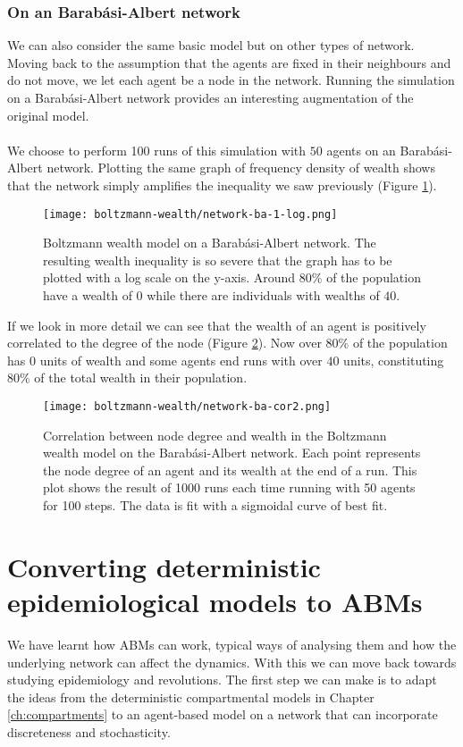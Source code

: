 \subsubsection{On an Barab\'asi-Albert network}
We can also consider the same basic model but on other types of network. Moving back to the assumption that  the agents are fixed in their neighbours and do not move, we let each agent be a node in the network. Running the simulation on a Barab\'asi-Albert network provides an interesting augmentation of the original model.\\
\\
We choose to perform 100 runs of this simulation with $50$ agents on an Barab\'asi-Albert network. Plotting the same graph of frequency density of wealth shows that the network simply amplifies the inequality we saw previously (Figure \ref{fig:network-ba-1}).
\begin{figure}[!h]
	\centering
	\texttt{[image: boltzmann-wealth/network-ba-1-log.png]}
	\caption{Boltzmann wealth model on a Barab\'asi-Albert network. The resulting wealth inequality is so severe that the graph has to be plotted with a log scale on the y-axis. Around 80\% of the population have a wealth of $0$ while there are individuals with wealths of $40$.}
	\label{fig:network-ba-1}
\end{figure}
If we look in more detail we can see that the wealth of an agent is positively correlated to the degree of the node (Figure \ref{fig:network-ba-cor}). Now over $80\%$ of the population has $0$ units of wealth and some agents end runs with over $40$ units, constituting $80\%$ of the total wealth in their population.
\begin{figure}[h]
	\centering
	\texttt{[image: boltzmann-wealth/network-ba-cor2.png]}
	\caption{Correlation between node degree and wealth in the Boltzmann wealth model on the Barab\'asi-Albert network. Each point represents the node degree of an agent and its wealth at the end of a run. This plot shows the result of 1000 runs each time running with 50 agents for 100 steps. The data is fit with a sigmoidal curve of best fit.}
	\label{fig:network-ba-cor}
\end{figure}

\section{Converting deterministic epidemiological models to ABMs}
We have learnt how ABMs can work, typical ways of analysing them and how the underlying network can affect the dynamics. With this we can move back towards studying epidemiology and revolutions. The first step we can make is to adapt the ideas from the deterministic compartmental models in Chapter \ref{ch:compartments} to an agent-based model on a network that can incorporate discreteness and stochasticity.
